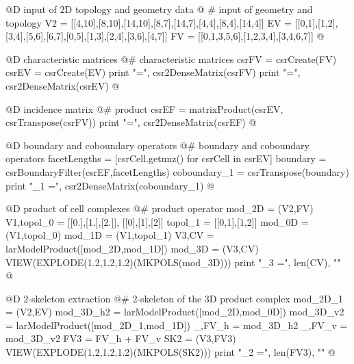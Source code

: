 \documentclass[11pt,oneside]{article}    %
\begin{document}
@D input of 2D topology and geometry data
@{
# input of geometry and topology  
V2 = [[4,10],[8,10],[14,10],[8,7],[14,7],[4,4],[8,4],[14,4]]
EV = [[0,1],[1,2],[3,4],[5,6],[6,7],[0,5],[1,3],[2,4],[3,6],[4,7]]
FV = [[0,1,3,5,6],[1,2,3,4],[3,4,6,7]]
@}

@D characteristic matrices
@{# characteristic matrices
csrFV = csrCreate(FV)
csrEV = csrCreate(EV)
print "\nFV =\n", csr2DenseMatrix(csrFV)
print "\nEV =\n", csr2DenseMatrix(csrEV)
@}

@D incidence matrix
@{# product
csrEF = matrixProduct(csrEV, csrTranspose(csrFV))
print "\nEF =\n", csr2DenseMatrix(csrEF)
@}

@D boundary and coboundary operators
@{# boundary and coboundary operators
facetLengths = [csrCell.getnnz() for csrCell in csrEV]
boundary = csrBoundaryFilter(csrEF,facetLengths)
coboundary_1 = csrTranspose(boundary)
print "\ncoboundary_1 =\n", csr2DenseMatrix(coboundary_1)
@}

@D product of cell complexes
@{# product operator
mod_2D = (V2,FV)
V1,topol_0 = [[0.],[1.],[2.]], [[0],[1],[2]]
topol_1 = [[0,1],[1,2]]
mod_0D = (V1,topol_0)
mod_1D = (V1,topol_1)
V3,CV = larModelProduct([mod_2D,mod_1D])
mod_3D = (V3,CV)
VIEW(EXPLODE(1.2,1.2,1.2)(MKPOLS(mod_3D)))
print "\nk_3 =", len(CV), "\n"
@}

@D 2-skeleton extraction
@{# 2-skeleton of the 3D product complex
mod_2D_1 = (V2,EV)
mod_3D_h2 = larModelProduct([mod_2D,mod_0D])
mod_3D_v2 = larModelProduct([mod_2D_1,mod_1D])
_,FV_h = mod_3D_h2
_,FV_v = mod_3D_v2
FV3 = FV_h + FV_v
SK2 = (V3,FV3)
VIEW(EXPLODE(1.2,1.2,1.2)(MKPOLS(SK2)))
print "\nk_2 =", len(FV3), "\n"
@}
\end{document}
